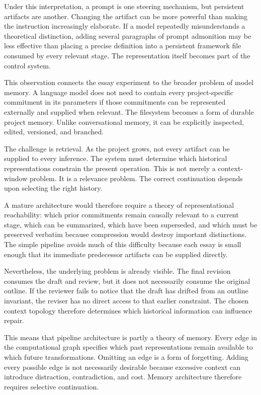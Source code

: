 \documentclass[11pt]{article}
\begin{document}
Under this interpretation, a prompt is one steering mechanism, but persistent artifacts are another. Changing the artifact can be more powerful than making the instruction increasingly elaborate. If a model repeatedly misunderstands a theoretical distinction, adding several paragraphs of prompt admonition may be less effective than placing a precise definition into a persistent framework file consumed by every relevant stage. The representation itself becomes part of the control system.

This observation connects the essay experiment to the broader problem of model memory. A language model does not need to contain every project-specific commitment in its parameters if those commitments can be represented externally and supplied when relevant. The filesystem becomes a form of durable project memory. Unlike conversational memory, it can be explicitly inspected, edited, versioned, and branched.

The challenge is retrieval. As the project grows, not every artifact can be supplied to every inference. The system must determine which historical representations constrain the present operation. This is not merely a context-window problem. It is a relevance problem. The correct continuation depends upon selecting the right history.

A mature architecture would therefore require a theory of representational reachability: which prior commitments remain causally relevant to a current stage, which can be summarized, which have been superseded, and which must be preserved verbatim because compression would destroy important distinctions. The simple pipeline avoids much of this difficulty because each essay is small enough that its immediate predecessor artifacts can be supplied directly.

Nevertheless, the underlying problem is already visible. The final revision consumes the draft and review, but it does not necessarily consume the original outline. If the reviewer fails to notice that the draft has drifted from an outline invariant, the reviser has no direct access to that earlier constraint. The chosen context topology therefore determines which historical information can influence repair.

This means that pipeline architecture is partly a theory of memory. Every edge in the computational graph specifies which past representations remain available to which future transformations. Omitting an edge is a form of forgetting. Adding every possible edge is not necessarily desirable because excessive context can introduce distraction, contradiction, and cost. Memory architecture therefore requires selective continuation.
\end{document}
